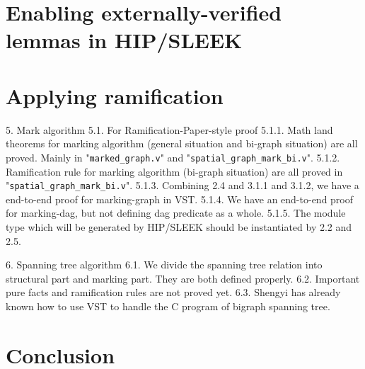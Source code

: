 \documentclass[pldi]{sigplanconf-pldi15}
\begin{document}
\section{Enabling externally-verified lemmas in HIP/SLEEK}
%


\section{Applying ramification}\label{sec:application}


5. Mark algorithm
5.1. For Ramification-Paper-style proof
5.1.1. Math land theorems for marking algorithm (general situation and bi-graph situation) are all proved. Mainly in "\texttt{marked\_graph.v}" and "\texttt{spatial\_graph\_mark\_bi.v}".
5.1.2. Ramification rule for marking algorithm (bi-graph situation) are all proved in "\texttt{spatial\_graph\_mark\_bi.v}".
5.1.3. Combining 2.4 and 3.1.1 and 3.1.2, we have a end-to-end proof for marking-graph in VST.
5.1.4. We have an end-to-end proof for marking-dag, but not defining dag predicate as a whole.
5.1.5. The module type which will be generated by HIP/SLEEK should be instantiated by 2.2 and 2.5.

6. Spanning tree algorithm
6.1. We divide the spanning tree relation into structural part and marking part. They are both defined properly.
6.2. Important pure facts and ramification rules are not proved yet.
6.3. Shengyi has already known how to use VST to handle the C program of bigraph spanning tree.



\section{Conclusion}


%



\end{document}
